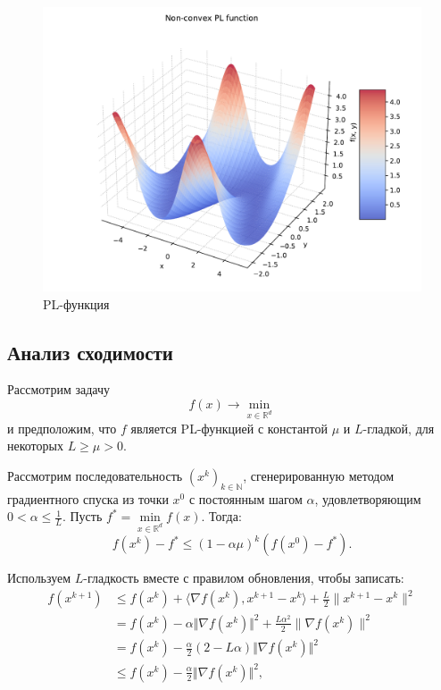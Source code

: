 \documentclass[
  russian,
  letterpaper,
  DIV=11,
  numbers=noendperiod]{scrartcl}
\begin{document}
\begin{figure}[H]

{\centering \includegraphics[width=0.5\linewidth,height=\textheight,keepaspectratio]{pl_3d.pdf}

}

\caption{PL-функция}

\end{figure}%

\subsection{Анализ
сходимости}\label{ux430ux43dux430ux43bux438ux437-ux441ux445ux43eux434ux438ux43cux43eux441ux442ux438-1}

\begin{tcolorbox}[enhanced jigsaw, bottomrule=.15mm, coltitle=black, opacitybacktitle=0.6, colbacktitle=quarto-callout-color!10!white, colback=white, opacityback=0, toprule=.15mm, bottomtitle=1mm, toptitle=1mm, arc=.35mm, title=\textcolor{quarto-callout-color}{\faInfo}\hspace{0.5em}{Theorem}, titlerule=0mm, rightrule=.15mm, leftrule=.75mm, left=2mm, colframe=quarto-callout-color-frame, breakable]

Рассмотрим задачу \[
f(x) \to \min_{x \in \mathbb{R}^d}
\] и предположим, что \(f\) является PL-функцией с константой \(\mu\) и
\(L\)-гладкой, для некоторых \(L\geq \mu > 0\).

Рассмотрим последовательность \((x^k)_{k \in \mathbb{N}}\),
сгенерированную методом градиентного спуска из точки \(x^0\) с
постоянным шагом \(\alpha\), удовлетворяющим
\(0<\alpha \leq \frac{1}{L}\). Пусть
\(f^* = \min\limits_{x \in \mathbb{R}^d} f(x)\). Тогда: \[
f(x^{k})-f^* \leq (1-\alpha \mu)^k (f(x^0)-f^*).
\]

\end{tcolorbox}

Используем \(L\)-гладкость вместе с правилом обновления, чтобы записать:
\[
\begin{split}
 f(x^{k+1})& \leq f(x^{k}) + \langle \nabla f(x^{k}), x^{k+1}-x^{k} \rangle +\frac{L}{2} \| x^{k+1}-x^{k}\|^2\\ 
 &= f(x^{k})-\alpha\Vert \nabla f(x^{k}) \Vert^2 +\frac{L \alpha^2}{2} \| \nabla f(x^{k})\|^2 \\ 
 &= f(x^{k}) - \frac{\alpha}{2} \left(2 - L \alpha \right)\Vert \nabla f(x^{k}) \Vert^2 \\ 
 & \leq f(x^{k}) - \frac{\alpha}{2}\Vert \nabla f(x^{k})\Vert^2,
\end{split}
\]
\end{document}
